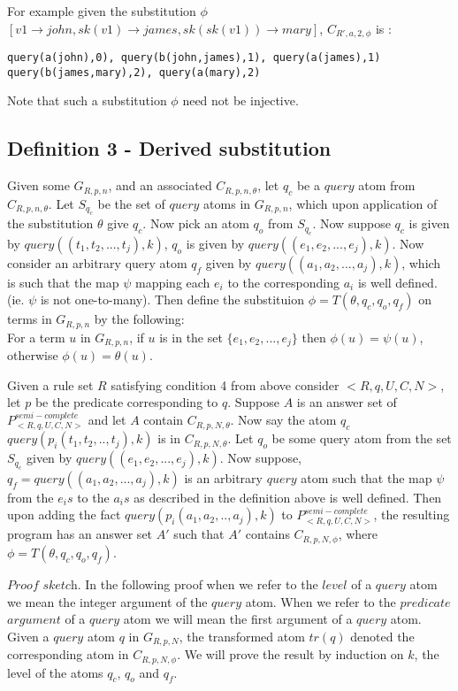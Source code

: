 \documentclass[sigconf]{acmart}
\begin{document}
For example given the substitution $\phi$ $[v1\rightarrow john, sk(v1)
\rightarrow james, sk(sk(v1))\rightarrow mary]$, $C_{R',a,2,\phi}$ is :

\begin{verbatim}
query(a(john),0), query(b(john,james),1), query(a(james),1)
query(b(james,mary),2), query(a(mary),2) \end{verbatim}
Note that such a substitution $\phi$ need not be injective.


\subsection{Definition 3 - Derived substitution}
Given some $G_{R,p,n}$, and an associated $C_{R,p,n,\theta}$, let $q_{c}$ be a $query$ atom from $C_{R,p,n,\theta}$. Let $S_{q_{c}}$ be the set of $query$ atoms in $G_{R,p,n}$, which upon application of the substitution $\theta$ give $q_{c}$. Now pick an atom $q_{o}$ from $S_{q_{c}}$. Now suppose $q_{c}$ is given by $query((t_{1},t_{2},...,t_{j}),k)$, $q_{o}$ is given by $query((e_{1},e_{2},...,e_{j}),k)$. Now consider an arbitrary query atom $q_{f}$ given by $query((a_{1},a_{2},...,a_{j}),k)$, which is such that the map $\psi$ mapping each $e_{i}$ to the corresponding $a_{i}$ is well defined. (ie. $\psi$ is not one-to-many). Then define the substituion $\phi = T(\theta, q_{c},q_{o},q_{f})$ on terms in $G_{R,p,n}$ by the following:\\ For a term $u$ in $G_{R,p,n}$, if $u$ is in the set $\{e_{1},e_{2},...,e_{j}\}$ then $\phi(u) = \psi(u)$, otherwise $\phi(u) = \theta(u)$.

\begin{theorem}\label{termsub}
Given a rule set $R$ satisfying condition 4 from above consider $<R,q,U,C,N>$, let $p$ be the predicate corresponding to $q$. Suppose $A$ is an answer set of $P^{semi-complete}_{<R,q,U,C,N>}$ and let $A$ contain $C_{R,p,N,\theta}$. Now say the atom $q_{c}$ $query(p_{i}(t_{1},t_{2},..,t_{j}),k)$ is in $C_{R,p,N,\theta}$. Let $q_{o}$ be some query atom from the set $S_{q_{c}}$ given by $query((e_{1},e_{2},...,e_{j}),k)$. Now suppose, $q_{f}= query((a_{1},a_{2},...,a_{j}),k)$ is an arbitrary $query$ atom such that the map $\psi$ from the $e_{i}s$ to the $a_{i}s$ as described in the definition above is well defined. Then upon adding the fact $query(p_{i}(a_{1},a_{2},..,a_{j}),k)$ to $P^{semi-complete}_{<R,q,U,C,N>}$, the resulting program has an answer set $A'$ such that $A'$ contains $C_{R,p,N,\phi}$, where $\phi = T(\theta, q_{c}, q_{o}, q_{f})$. 
\end{theorem}
$\textit{Proof sketch}$. In the following proof when we refer to the $level$ of a $query$ atom we mean the integer argument of the $query$ atom. When we refer to the $predicate$ $argument$ of a $query$ atom we will mean the first argument of a $query$ atom. Given a $query$ atom $q$ in $G_{R,p,N}$, the transformed atom $tr(q)$ denoted the corresponding atom in $C_{R,p,N,\phi}$. We will prove the result by induction on $k$, the level of the atoms $q_{c}$, $q_{o}$ and $q_{f}$. 
\end{document}
